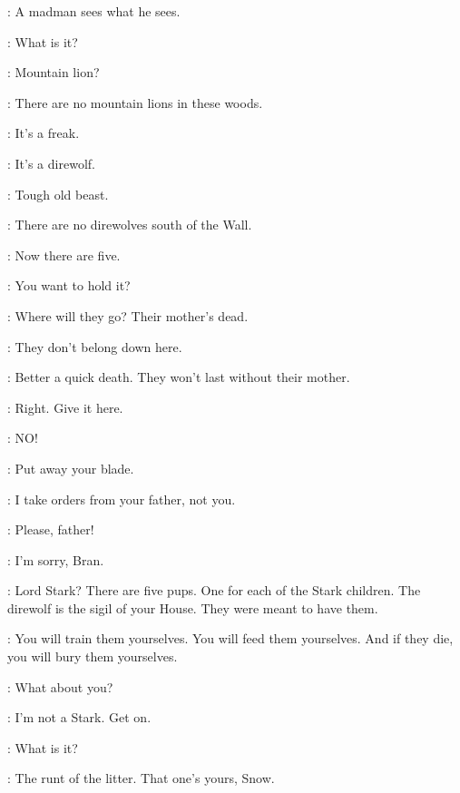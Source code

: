 \NED: A madman sees what he sees. 


\JON: What is it? 

\THEON: Mountain lion? 

\NED: There are no mountain lions in these woods. 


\THEON: It's a freak. 

\NED: It's a direwolf. 

\NED: Tough old beast. 

\ROBB: There are no direwolves south of the Wall. 

\JON: Now there are five. 


\JON: You want to hold it? 

\BRAN: Where will they go? Their mother's dead. 

\RODRIK: They don't belong down here. 

\NED: Better a quick death. They won't last without their mother. 

\THEON: Right. Give it here. 

\BRAN: NO! 

\ROBB: Put away your blade. 

\THEON: I take orders from your father, not you. 

\BRAN: Please, father! 

\NED: I'm sorry, Bran. 

\JON: Lord Stark? There are five pups. One for each of the Stark children. The direwolf is the sigil of your House. They were meant to have them. 

\NED: You will train them yourselves. You will feed them yourselves. And if they die, you will bury them yourselves. 


\BRAN: What about you? 

\JON: I'm not a Stark. Get on. 


\ROBB: What is it? 


\THEON: The runt of the litter. That one's yours, Snow. 


